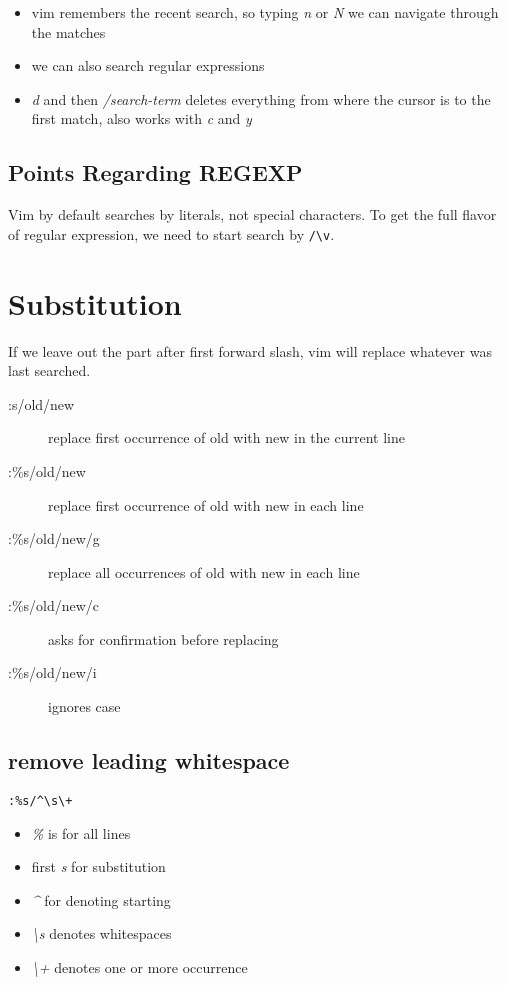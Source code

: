 \documentclass[a4paper, 12pt]{article}
\begin{document}
\begin{itemize}
	\item vim remembers the recent search, so typing \emph{n} or \emph{N} we can navigate through the matches 
	\item we can also search regular expressions
	\item \emph{d} and then \emph{/search-term} deletes everything from where the cursor is to the first match, also works with \emph{c} and \emph{y}
\end{itemize}
\subsection{Points Regarding REGEXP}
Vim by default searches by literals, not special characters. To get the full flavor of regular expression, we need to start search by \verb|/\v|.

\section{Substitution}
If we leave out the part after first forward slash, vim will replace whatever was last searched.
\begin{description}
	\item[:s/old/new] replace first occurrence of old with new in the current line 
	\item[:\%s/old/new] replace first occurrence of old with new in each line
	\item[:\%s/old/new/g] replace all occurrences of old with new in each line
	\item[:\%s/old/new/c] asks for confirmation before replacing
	\item[:\%s/old/new/i] ignores case
\end{description}

\subsection{remove leading whitespace}
\begin{verbatim}
:%s/^\s\+
\end{verbatim}
\begin{itemize}
	\item \emph{\%} is for all lines
	\item first \emph{s} for substitution
	\item \emph{\^} for denoting starting
	\item \emph{\textbackslash s} denotes whitespaces
	\item \emph{\textbackslash +} denotes one or more occurrence
\end{itemize}
\end{document}
